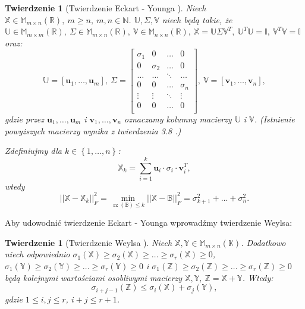 \documentclass[12pt,a4paper]{report}
\newtheorem{tw}[df]{Twierdzenie}
\newcommand{\set}[1]{\left\lbrace {#1} \right\rbrace}
\newcommand{\setR}{\mathbb{R}}
\newcommand{\setK}{\mathbb{K}}
\newcommand{\setN}{\mathbb{N}}
\newcommand{\rz}[1]{\operatorname{rz}\left({#1} \right)}
\begin{document}
\begin{tw}[Twierdzenie Eckart - Younga {\citep{ulafiir}}]%
Niech $\mathbb{X} \in \mathbb{M}_{m \times n}(\setR),\: m \geq n, \:  m,n \in \setN$. $\mathbb{U}, \Sigma, \mathbb{V}$ niech będą takie, że $\mathbb{U} \in \mathbb{M}_{m \times m}(\setR), \: \Sigma \in \mathbb{M}_{m \times n}(\setR), \: \mathbb{V} \in \mathbb{M}_{n \times n}(\setR), \: \mathbb{X}=\mathbb{U}\Sigma \mathbb{V}^T, \: \mathbb{U}^T \mathbb{U} = \mathbb{I}, \: \mathbb{V}^T \mathbb{V} =\mathbb{I}$ oraz:
$$
\mathbb{U} = [\mathbf{u}_1, \ldots, \mathbf{u}_m], \: \Sigma = \left[
        \begin{array}{cccc}
         \sigma_{1} & 0 & \ldots & 0 \\
         0 & \sigma_{2} & \ldots & 0 \\
         \ldots & \ldots& \ddots & \ldots \\
         0 & 0 & \ldots & \sigma_{n} \\
         \vdots & \vdots & \ddots & \vdots \\
         0 & 0 & \ldots & 0 \\
         \end{array}
      \right], \: \mathbb{V} = [\mathbf{v}_1, \ldots, \mathbf{v}_n],
$$
gdzie przez $\mathbf{u}_1, \ldots, \mathbf{u}_m$ i $\mathbf{v}_1, \ldots, \mathbf{v}_n$ oznaczamy kolumny macierzy $\mathbb{U}$ i $\mathbb{V}$. (Istnienie powyższych macierzy wynika z twierdzenia 3.8 .) 

Zdefiniujmy dla $k \in \set{1, \ldots, n}$:
$$
\mathbb{X}_k = \sum_{i=1}^k \mathbf{u}_i\cdot \sigma_{i} \cdot \mathbf{v}_i^T,
$$
wtedy
$$
||\mathbb{X} - \mathbb{X}_k||_F^2 = \min \limits_{\rz{\mathbb{B}} \leqslant k } ||\mathbb{X} - \mathbb{B}||_F^2 = \sigma_{k+1}^2 + ... + \sigma_{n}^2.
$$
\end{tw}

Aby udowodnić twierdzenie Eckart - Younga wprowadźmy twierdzenie Weylsa:

\begin{tw}[Twierdzenie Weylsa {\citep[Tw. 4.17]{tsvdalra}}]
Niech $\mathbb{X}, \mathbb{Y} \in \mathbb{M}_{m \times n}(\setK)$.
Dodatkowo niech odpowiednio $\sigma_1(\mathbb{X}) \geq \sigma_2(\mathbb{X})\geq \ldots \geq \sigma_r(\mathbb{X})\geq 0$, $\sigma_1(\mathbb{Y}) \geq \sigma_2(\mathbb{Y})\geq \ldots \geq \sigma_r(\mathbb{Y})\geq 0$ i $\sigma_1(\mathbb{Z}) \geq \sigma_2(\mathbb{Z})\geq \ldots \geq \sigma_r(\mathbb{Z})\geq 0$ będą kolejnymi wartościami osobliwymi macierzy $\mathbb{X}, \mathbb{Y}, \: \mathbb{Z}=\mathbb{X} + \mathbb{Y}$. Wtedy:
$$
\sigma_{i+j-1}(\mathbb{Z}) \leq \sigma_i(\mathbb{X}) + \sigma_j(\mathbb{Y}),
$$
gdzie $1 \leq i,j \leq r$, $i+j\leq r+1$.
\end{tw}
\end{document}
